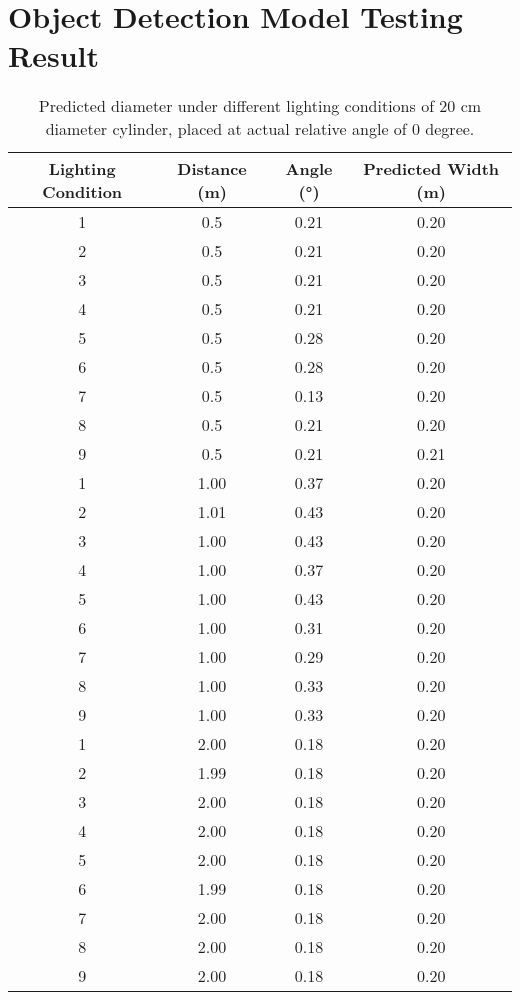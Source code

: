\documentclass{report}
\begin{document}
\appendix
\chapter{Object Detection Model Testing Result}

\begin{table}[t]
    \centering
    \caption{Predicted diameter under different lighting conditions of 20 cm diameter cylinder, placed at actual relative angle of 0 degree.}
    \label{tab:20cm}
    \begin{tabular}{cccc}
    \toprule
    \textbf{Lighting Condition} & \textbf{Distance (m)} & \textbf{Angle (°)} & \textbf{Predicted Width (m)} \\
    \midrule
    1 & 0.5 & 0.21 & 0.20 \\
    2 & 0.5 & 0.21 & 0.20 \\
    3 & 0.5 & 0.21 & 0.20 \\
    4 & 0.5 & 0.21 & 0.20 \\
    5 & 0.5 & 0.28 & 0.20 \\
    6 & 0.5 & 0.28 & 0.20 \\
    7 & 0.5 & 0.13 & 0.20 \\
    8 & 0.5 & 0.21 & 0.20 \\
    9 & 0.5 & 0.21 & 0.21 \\
    \cmidrule(lr){1-4}
    1 & 1.00 & 0.37 & 0.20 \\
    2 & 1.01 & 0.43 & 0.20 \\
    3 & 1.00 & 0.43 & 0.20 \\
    4 & 1.00 & 0.37 & 0.20 \\
    5 & 1.00 & 0.43 & 0.20 \\
    6 & 1.00 & 0.31 & 0.20 \\
    7 & 1.00 & 0.29 & 0.20 \\
    8 & 1.00 & 0.33 & 0.20 \\
    9 & 1.00 & 0.33 & 0.20 \\
    \cmidrule(lr){1-4}
    1 & 2.00 & 0.18 & 0.20 \\
    2 & 1.99 & 0.18 & 0.20 \\
    3 & 2.00 & 0.18 & 0.20 \\
    4 & 2.00 & 0.18 & 0.20 \\
    5 & 2.00 & 0.18 & 0.20 \\
    6 & 1.99 & 0.18 & 0.20 \\
    7 & 2.00 & 0.18 & 0.20 \\
    8 & 2.00 & 0.18 & 0.20 \\
    9 & 2.00 & 0.18 & 0.20 \\

\end{tabular}
\end{table}
\end{document}
